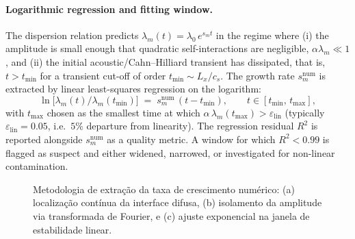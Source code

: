 \paragraph{Logarithmic regression and fitting window.}
The dispersion relation predicts $\lambda_m(t) = \lambda_0\,e^{s_m t}$ in the regime where (i) the amplitude is small enough that quadratic self-interactions are negligible, $\alpha\lambda_m \ll 1$, and (ii) the initial acoustic/Cahn--Hilliard transient has dissipated, that is, $t > t_{\min}$ for a transient cut-off of order $t_{\min} \sim L_x/c_s$.
The growth rate $s_m^{\mathrm{num}}$ is extracted by linear least-squares regression on the logarithm:
\begin{equation}
\ln\!\bigl[\lambda_m(t)/\lambda_m(t_{\min})\bigr]
\;=\; s_m^{\mathrm{num}}\,(t - t_{\min}),
\qquad t \in [t_{\min},\,t_{\max}],
\label{eq:log-regression}
\end{equation}
with $t_{\max}$ chosen as the smallest time at which $\alpha\,\lambda_m(t_{\max}) > \varepsilon_{\mathrm{lin}}$ (typically $\varepsilon_{\mathrm{lin}} = 0.05$, i.e.\ $5\%$ departure from linearity).
The regression residual $R^{2}$ is reported alongside $s_m^{\mathrm{num}}$ as a quality metric.
A window for which $R^{2} < 0.99$ is flagged as suspect and either widened, narrowed, or investigated for non-linear contamination.

\begin{figure}[H]
    \centering
    \caption{Metodologia de extração da taxa de crescimento numérico: (a) localização contínua da interface difusa, (b) isolamento da amplitude via transformada de Fourier, e (c) ajuste exponencial na janela de estabilidade linear.}
    \label{fig:growth-rate-extraction}
\end{figure}

